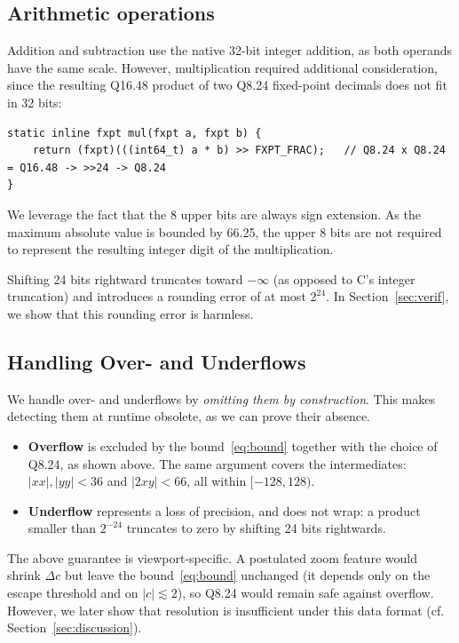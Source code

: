 \documentclass[10pt,a4paper]{article}
\newcommand{\Q}[2]{Q#1.#2}
\begin{document}
\subsection{Arithmetic operations}

Addition and subtraction use the native 32-bit integer addition, as both operands have the 
same scale. However, multiplication required additional consideration, since the resulting 
\Q{16}{48} product of two \Q{8}{24} fixed-point decimals does not fit in 32 bits:

\begin{lstlisting}
static inline fxpt mul(fxpt a, fxpt b) {
    return (fxpt)(((int64_t) a * b) >> FXPT_FRAC);   // Q8.24 x Q8.24 = Q16.48 -> >>24 -> Q8.24
}
\end{lstlisting}

We leverage the fact that the 8 upper bits are always sign extension.
As the maximum absolute value is bounded by 66.25, the upper 8 bits
are not required to represent the resulting integer digit of the multiplication.

Shifting 24 bits rightward truncates toward $-\infty$ (as opposed to C's integer truncation) and introduces a rounding error of at most $2^{24}$.
In Section~\ref{sec:verif}, we show that this rounding error is harmless.

\subsection{Handling Over- and Underflows}

We handle over- and underflows by \textit{omitting them by construction}.
This makes detecting them at runtime obsolete, as we can prove their absence.

\begin{itemize}\itemsep0pt
  \item \textbf{Overflow} is excluded by the bound~\eqref{eq:bound} together with the choice of
        \Q{8}{24}, as shown above. The same argument covers the intermediates:
        $|xx|, |yy| < 36$ and $|2xy| < 66$, all within $[-128, 128)$.
  \item \textbf{Underflow} represents a loss of precision, and does not wrap: a product smaller
        than $2^{-24}$ truncates to zero by shifting 24 bits rightwards.
\end{itemize}

The above guarantee is viewport-specific. A postulated zoom feature would shrink $\Delta c$ but leave the
bound~\eqref{eq:bound} unchanged (it depends only on the escape threshold and on
$|c| \lesssim 2$), so \Q{8}{24} would remain safe against overflow. 
However, we later show that resolution is insufficient under this data format (cf. Section~\ref{sec:discussion}).
\end{document}
